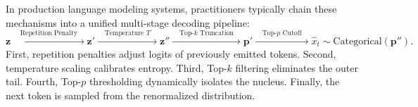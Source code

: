 \documentclass[../../../main.tex]{subfiles}
\begin{document}
In production language modeling systems, practitioners typically chain these mechanisms into a unified multi-stage decoding pipeline:
\begin{equation}
\mathbf{z} \xrightarrow{\quad \text{Repetition Penalty} \quad} \mathbf{z}' \xrightarrow{\quad \text{Temperature } T \quad} \mathbf{z}'' \xrightarrow{\quad \text{Top-}k \text{ Truncation} \quad} \mathbf{p}' \xrightarrow{\quad \text{Top-}p \text{ Cutoff} \quad} \hat{x}_t \sim \text{Categorical}(\mathbf{p}'').
\label{eq:decoding_pipeline_stages}
\end{equation}
First, repetition penalties adjust logits of previously emitted tokens. Second, temperature scaling calibrates entropy. Third, Top-$k$ filtering eliminates the outer tail. Fourth, Top-$p$ thresholding dynamically isolates the nucleus. Finally, the next token is sampled from the renormalized distribution.
\end{document}
